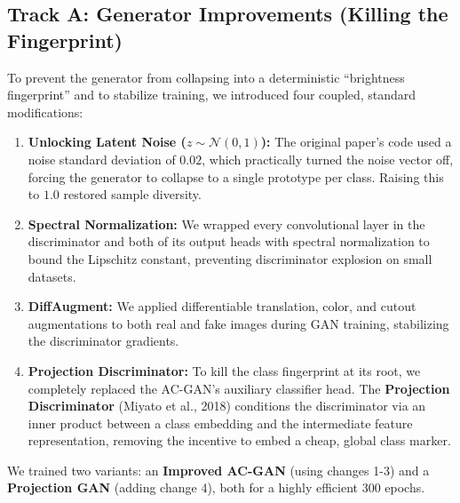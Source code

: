\documentclass[11pt]{article}
\begin{document}
\subsection{Track A: Generator Improvements (Killing the Fingerprint)}
To prevent the generator from collapsing into a deterministic ``brightness fingerprint'' and to stabilize training, we introduced four coupled, standard modifications:
\begin{enumerate}[nosep, leftmargin=1.5em]
  \item \textbf{Unlocking Latent Noise ($z \sim \mathcal{N}(0, 1)$):} The original paper's code used a noise standard deviation of $0.02$, which practically turned the noise vector off, forcing the generator to collapse to a single prototype per class. Raising this to $1.0$ restored sample diversity.
  \item \textbf{Spectral Normalization:} We wrapped every convolutional layer in the discriminator and both of its output heads with spectral normalization to bound the Lipschitz constant, preventing discriminator explosion on small datasets.
  \item \textbf{DiffAugment:} We applied differentiable translation, color, and cutout augmentations to both real and fake images during GAN training, stabilizing the discriminator gradients.
  \item \textbf{Projection Discriminator:} To kill the class fingerprint at its root, we completely replaced the AC-GAN's auxiliary classifier head. The \textbf{Projection Discriminator} (Miyato et al., 2018) conditions the discriminator via an inner product between a class embedding and the intermediate feature representation, removing the incentive to embed a cheap, global class marker.
\end{enumerate}

We trained two variants: an \textbf{Improved AC-GAN} (using changes 1-3) and a \textbf{Projection GAN} (adding change 4), both for a highly efficient 300 epochs.
\end{document}
